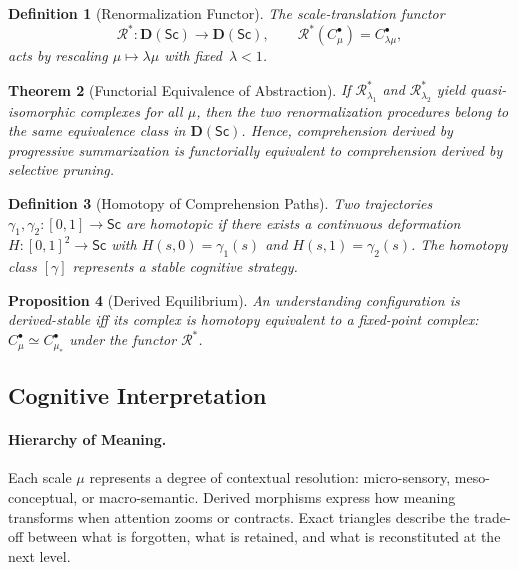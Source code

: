\documentclass[12pt,a4paper,twoside,openright]{book}
\newtheorem{theorem}{Theorem}
\newtheorem{proposition}[theorem]{Proposition}
\newtheorem{definition}[theorem]{Definition}
\begin{document}
\begin{definition}[Renormalization Functor]
The scale-translation functor
\[
\mathcal{R}^\ast:\mathbf{D}(\mathsf{Sc})\longrightarrow\mathbf{D}(\mathsf{Sc}),
\qquad
\mathcal{R}^\ast(C_\mu^\bullet)=C_{\lambda\mu}^\bullet,
\]
acts by rescaling $\mu\mapsto\lambda\mu$ with fixed~$\lambda\!<\!1$.
\end{definition}

\begin{theorem}[Functorial Equivalence of Abstraction]
\label{thm:functor}
If $\mathcal{R}_{\lambda_1}^\ast$ and $\mathcal{R}_{\lambda_2}^\ast$
yield quasi-isomorphic complexes for all $\mu$,
then the two renormalization procedures belong to the same
equivalence class in $\mathbf{D}(\mathsf{Sc})$.
Hence, comprehension derived by progressive summarization
is functorially equivalent to comprehension derived by selective pruning.
\end{theorem}

\begin{definition}[Homotopy of Comprehension Paths]
Two trajectories $\gamma_1,\gamma_2:[0,1]\to\mathsf{Sc}$ are homotopic
if there exists a continuous deformation
$H:[0,1]^2\to\mathsf{Sc}$ with
$H(s,0)=\gamma_1(s)$ and $H(s,1)=\gamma_2(s)$.
The homotopy class $[\gamma]$
represents a stable cognitive strategy.
\end{definition}

\begin{proposition}[Derived Equilibrium]
An understanding configuration is \emph{derived-stable}
iff its complex is homotopy equivalent to a fixed-point complex:
\(
C_\mu^\bullet\simeq C_{\mu_\ast}^\bullet
\)
under the functor $\mathcal{R}^\ast$.
\end{proposition}

\subsection*{Cognitive Interpretation}

\paragraph{Hierarchy of Meaning.}
Each scale $\mu$ represents a degree of contextual resolution:
micro-sensory, meso-conceptual, or macro-semantic.
Derived morphisms express how meaning transforms
when attention zooms or contracts.
Exact triangles describe the trade-off between what is forgotten,
what is retained, and what is reconstituted at the next level.
\end{document}
